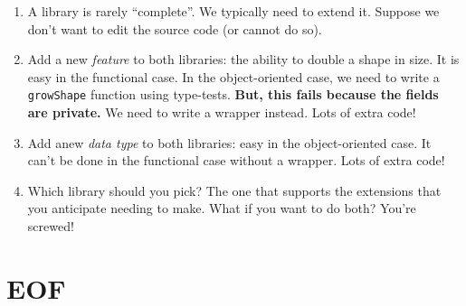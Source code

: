 \documentclass[9pt]{extbook}
\begin{document}
\begin{enumerate}
  \item A library is rarely ``complete''. We typically need to extend it. Suppose we
    don't want to edit the source code (or cannot do so).

  \item Add a new \emph{feature} to both libraries: the ability to
    double a shape in size. It is easy in the functional case. In the
    object-oriented case, we need to write a \lstinline|growShape|
    function using type-tests. \textbf{But, this fails because the
      fields are private.} We need to write a wrapper instead. Lots of extra code!

  \item Add anew \emph{data type} to both libraries: easy in the object-oriented
    case. It can't be done in the functional case without a wrapper. Lots of extra code!

  \item Which library should you pick? The one that supports the extensions that you
    anticipate needing to make. What if you want to do both? You're screwed!

\end{enumerate}

\chapter{EOF}
\end{document}
